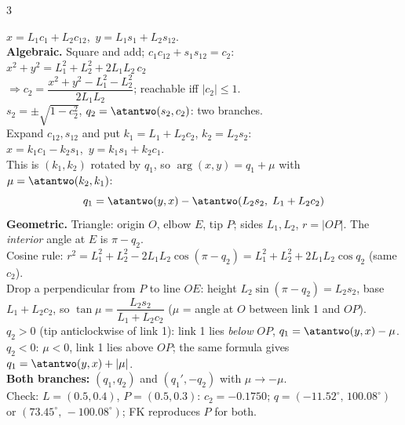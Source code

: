 \begin{multicols}{3}
\begin{fbx}
$x=L_1c_1+L_2c_{12}$,\ $y=L_1s_1+L_2s_{12}$.\\
\textbf{Algebraic.} Square and add; $c_1c_{12}+s_1s_{12}=c_2$:\\
$x^2+y^2=L_1^2+L_2^2+2L_1L_2\,c_2$\\
$\Rightarrow c_2=\dfrac{x^2+y^2-L_1^2-L_2^2}{2L_1L_2}$; reachable iff $|c_2|\le1$.\\
$s_2=\pm\sqrt{1-c_2^2}$, $q_2=\atantwo(s_2,c_2)$: two branches.\\
Expand $c_{12},s_{12}$ and put $k_1=L_1+L_2c_2$, $k_2=L_2s_2$:\\
$x=k_1c_1-k_2s_1$,\ $y=k_1s_1+k_2c_1$.\\
This is $(k_1,k_2)$ rotated by $q_1$, so $\arg(x,y)=q_1+\mu$ with $\mu=\atantwo(k_2,k_1)$:
\[q_1=\atantwo(y,x)-\atantwo(L_2s_2,\;L_1+L_2c_2)\]
\textbf{Geometric.} Triangle: origin $O$, elbow $E$, tip $P$; sides $L_1,L_2$, $r=|OP|$. The \emph{interior} angle at $E$ is $\pi-q_2$.\\
Cosine rule: $r^2=L_1^2+L_2^2-2L_1L_2\cos(\pi-q_2)=L_1^2+L_2^2+2L_1L_2\cos q_2$ (same $c_2$).\\
Drop a perpendicular from $P$ to line $OE$: height $L_2\sin(\pi-q_2)=L_2s_2$, base $L_1+L_2c_2$, so $\tan\mu=\dfrac{L_2s_2}{L_1+L_2c_2}$ ($\mu$ = angle at $O$ between link 1 and $OP$).\\
$q_2>0$ (tip anticlockwise of link 1): link 1 lies \emph{below} $OP$, $q_1=\atantwo(y,x)-\mu$.\\
$q_2<0$: $\mu<0$, link 1 lies above $OP$; the same formula gives $q_1=\atantwo(y,x)+|\mu|$.\\
\textbf{Both branches:} $(q_1,q_2)$ and $(q_1',-q_2)$ with $\mu\to-\mu$.\\
Check: $L=(0.5,0.4)$, $P=(0.5,0.3)$: $c_2=-0.1750$; $q=(-11.52^\circ,\,100.08^\circ)$ or $(73.45^\circ,\,-100.08^\circ)$; FK reproduces $P$ for both. \chk
\end{fbx}


\end{multicols}
